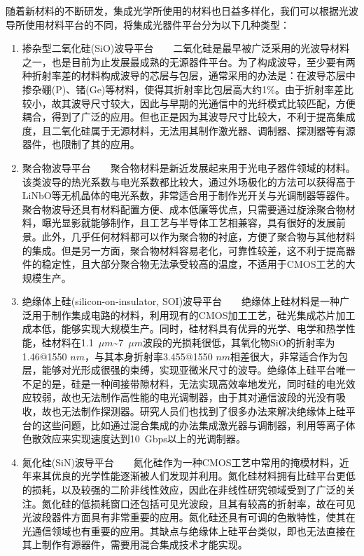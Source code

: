 随着新材料的不断研发，集成光学所使用的材料也日益多样化，我们可以根据光波导所使用材料平台的不同，将集成光器件平台分为以下几种类型：

\begin{enumerate}[(1)]
	\item 
	掺杂型二氧化硅(SiO)波导平台~~~~二氧化硅是最早被广泛采用的光波导材料之一，也是目前为止发展最成熟的无源器件平台。为了构成波导，至少要有两种折射率差的材料构成波导的芯层与包层，通常采用的办法是：在波导芯层中掺杂硼(P)、锗(Ge)等材料，使得其折射率比包层高大约1\%。由于折射率差比较小，故其波导尺寸较大，因此与早期的光通信中的光纤模式比较匹配，方便耦合，得到了广泛的应用。但也正是因为其波导尺寸比较大，不利于提高集成度，且二氧化硅属于无源材料，无法用其制作激光器、调制器、探测器等有源器件，也限制了其的应用。
	\item 
	聚合物波导平台~~~~聚合物材料是新近发展起来用于光电子器件领域的材料。该类波导的热光系数与电光系数都比较大，通过外场极化的方法可以获得高于LiNbO等无机晶体的电光系数，非常适合用于制作光开关与光调制器等器件。聚合物波导还具有材料配置方便、成本低廉等优点，只需要通过旋涂聚合物材料，曝光显影就能够制作，且工艺与半导体工艺相兼容，具有很好的发展前景。此外，几乎任何材料都可以作为聚合物的衬底，方便了聚合物与其他材料的集成。但是另一方面，聚合物材料容易老化，可靠性较差，这不利于提高器件的稳定性，且大部分聚合物无法承受较高的温度，不适用于CMOS工艺的大规模生产。
	\item 
	绝缘体上硅(silicon-on-insulator, SOI)波导平台~~~~绝缘体上硅材料是一种广泛用于制作集成电路的材料，利用现有的CMOS加工工艺，硅光集成芯片加工成本低，能够实现大规模生产。同时，硅材料具有优异的光学、电学和热学性能，硅材料在1.1~$\mu m$\~{}7~$\mu m$波段的光损耗很低，其氧化物SiO的折射率为1.46@1550 $nm$，与其本身折射率3.455@1550 $nm$相差很大，非常适合作为包层，能够对光形成很强的束缚，实现亚微米尺寸的波导。绝缘体上硅平台唯一不足的是，硅是一种间接带隙材料，无法实现高效率地发光，同时硅的电光效应较弱，故也无法制作高性能的电光调制器，由于其对通信波段的光没有吸收，故也无法制作探测器。研究人员们也找到了很多办法来解决绝缘体上硅平台的这些问题，比如通过混合集成的办法集成激光器与调制器\cite{ma2017demonstration,fang2006electrically}，利用等离子体色散效应来实现速度达到10~Gbps以上的光调制器\cite{manipatruni2007high,fujikata201025,xiao201360}。
	\item 
	氮化硅(SiN)波导平台~~~~氮化硅作为一种CMOS工艺中常用的掩模材料，近年来其优良的光学性能逐渐被人们发现并利用\cite{moss2013new}。氮化硅材料拥有比硅平台更低的损耗，以及较强的二阶非线性效应，因此在非线性研究领域受到了广泛的关注。氮化硅的低损耗窗口还包括可见光波段，且其有较高的折射率，故在可见光波段器件方面具有非常重要的应用。氮化硅还具有可调的色散特性，使其在光通信领域也有重要的应用。其缺点与绝缘体上硅平台类似，即也无法直接在其上制作有源器件，需要用混合集成技术才能实现。

\end{enumerate}
